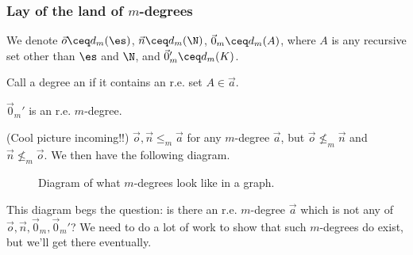 \documentclass[class=article, crop=false]{standalone}
\begin{document}
\subsubsection{Lay of the land of $m$-degrees}

\begin{nota}
  We denote $\vec o \ceq d_m(\es)$, $\vec n \ceq d_m(\N)$, $\vec 0_m \ceq d_m(A)$, where $A$ is any recursive set other than $\es$ and $\N$, and $\vec 0_m' \ceq d_m(K)$.
\end{nota}

\begin{defn}
  Call a degree an  if it contains an r.e. set $A \in \vec a$.
\end{defn}

\begin{ex}
  $\vec 0_m'$ is an r.e. $m$-degree.
\end{ex}

(Cool picture incoming!!) $\vec o, \vec n \leq_m \vec a$ for any $m$-degree $\vec a$, but $\vec o \not \leq_m \vec n$ and $\vec n \not \leq_m \vec o$. We then have the following diagram.

\begin{figure}[ht]
  \center
  \caption{Diagram of what $m$-degrees look like in a graph.}
  \label{fig:lay-of-the-land}
\end{figure}
\noindent This diagram begs the question: is there an r.e. $m$-degree $\vec a$ which is not any of $\vec o, \vec n, \vec 0_m, \vec 0_m'$? We need to do a lot of work to show that such $m$-degrees do exist, but we'll get there eventually.
\end{document}
